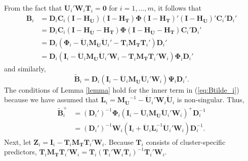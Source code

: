 \documentclass[12pt]{article}
\begin{document}
From the fact that
\(\mathbf{\ddot{U}}_i'\mathbf{W}_i\mathbf{T}_i = \mathbf{0}\) for
\(i = 1,...,m\), it follows that \begin{align}
\mathbf{B}_i &= \mathbf{D}_i \mathbf{C}_i \left(\mathbf{I} - \mathbf{H_{\ddot{U}}}\right) \left(\mathbf{I} - \mathbf{H_T}\right) \boldsymbol\Phi \left(\mathbf{I} - \mathbf{H_T}\right)' \left(\mathbf{I} - \mathbf{H_{\ddot{U}}}\right)' \mathbf{C}_i' \mathbf{D}_i' \nonumber \\ 
&= \mathbf{D}_i \mathbf{C}_i \left(\mathbf{I} - \mathbf{H_{\ddot{U}}} - \mathbf{H_T}\right) \boldsymbol\Phi \left(\mathbf{I} - \mathbf{H_{\ddot{U}}} - \mathbf{H_T}\right) \mathbf{C}_i' \mathbf{D}_i' \nonumber\\ 
&= \mathbf{D}_i \left(\boldsymbol\Phi_i - \mathbf{\ddot{U}}_i \mathbf{M_{\ddot{U}}}\mathbf{\ddot{U}}_i' - \mathbf{T}_i \mathbf{M_T}\mathbf{T}_i'\right)\mathbf{D}_i' \nonumber\\ 
\label{eq:B_i}
&= \mathbf{D}_i \left(\mathbf{I}_i - \mathbf{\ddot{U}}_i \mathbf{M_{\ddot{U}}}\mathbf{\ddot{U}}_i'\mathbf{W}_i - \mathbf{T}_i \mathbf{M_T}\mathbf{T}_i'\mathbf{W}_i\right) \boldsymbol\Phi_i \mathbf{D}_i'
\end{align} and similarly, \begin{equation}
\label{eq:Btilde_i}
\tilde{\mathbf{B}}_i = \mathbf{D}_i \left(\mathbf{I}_i - \mathbf{\ddot{U}}_i \mathbf{M_{\ddot{U}}}\mathbf{\ddot{U}}_i'\mathbf{W}_i\right) \boldsymbol\Psi_i \mathbf{D}_i'.
\end{equation} The conditions of Lemma \ref{lemma} hold for the inner
term in (\ref{eq:Btilde_i}) because we have assumed that
\(\mathbf{L}_i = \mathbf{M_{\ddot{U}}}^{-1} - \mathbf{\ddot{U}}_i' \mathbf{W}_i \mathbf{\ddot{U}}_i\)
is non-singular. Thus, \begin{align}
\tilde{\mathbf{B}}_i^+ &= \left(\mathbf{D}_i'\right)^{-1} \boldsymbol\Phi_i \left(\mathbf{I}_i - \mathbf{\ddot{U}}_i \mathbf{M_{\ddot{U}}}\mathbf{\ddot{U}}_i'\mathbf{W}_i\right)^+ \mathbf{D}_i^{-1} \nonumber \\
&= \left(\mathbf{D}_i'\right)^{-1} \mathbf{W}_i \left(\mathbf{I}_i + \mathbf{\ddot{U}}_i \mathbf{L}_i^{-1} \mathbf{\ddot{U}}_i' \mathbf{W}_i\right) \mathbf{D}_i^{-1}.
\end{align} Next, let
\(\mathbf{Z}_i = \mathbf{I}_i - \mathbf{T}_i \mathbf{M_T}\mathbf{T}_i'\mathbf{W}_i\).
Because \(\mathbf{T}_i\) consists of cluster-specific predictors,
\(\mathbf{T}_i \mathbf{M_T} \mathbf{T}_i' \mathbf{W}_i = \mathbf{T}_i \left(\mathbf{T}_i' \mathbf{W}_i\mathbf{T}_i\right)^{-1} \mathbf{T}_i' \mathbf{W}_i\).
\end{document}
